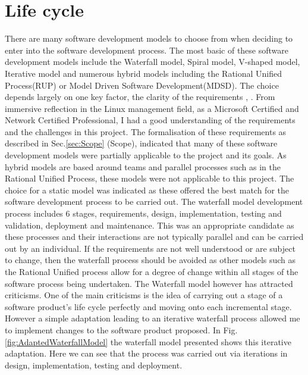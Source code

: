 \section{Life cycle}

	\normalsize
	{
		There are many software development models to choose from when deciding to enter into the software development process.
		The most basic of these software development models include the Waterfall model, Spiral model, V-shaped model, Iterative model
		and numerous hybrid models including the Rational Unified Process(RUP) or Model Driven Software Development(MDSD).			
		\newline
		\newline
		The choice depends largely on one key factor, the clarity of the requirements 
		\citet{CompleteDevelopmentCycle}, \citet{RequirementsVolatility}.
		From immersive reflection in the Linux management field, as a Microsoft Certified and Network Certified Professional,
		I had a good understanding of the requirements and the challenges in this project.  
		\newline
		\newline
		The formalisation of these requirements as described in Sec.\ref{sec:Scope} (Scope), indicated that many of these software development models 
		were partially applicable to the project and its goals.  As hybrid models are based around teams and parallel processes such as
		in the Rational Unified Process, these models were not applicable to this project.
		\newline
		\newline
		The choice for a static model was indicated as these offered the best match for the software development process to be carried out.	
		The waterfall model development process includes 6 stages, requirements, 
		design, implementation, testing and validation, deployment and maintenance.
		This was an appropriate candidate as these processes and their interactions are not typically 
		parallel and can be carried out by an individual.  
		\newline
		\newline
		If the requirements are not well understood or are subject to change, then the waterfall process should be avoided
		as other models such as the Rational Unified process allow for a degree of change within all stages of the software
		process being undertaken.
		\newline
		\newline
		The Waterfall model however has attracted criticisms.  One of the main criticisms is the idea of carrying out a stage of a software product's 
		life cycle perfectly and moving onto each incremental stage.  However a simple adaptation leading to an iterative waterfall process allowed me to 
		implement changes to the software product proposed. 	In Fig. \ref{fig:AdaptedWaterfallModel} the waterfall model presented shows this iterative adaptation.  
		Here we can see that the process was carried out via iterations in design, implementation, testing and deployment.
		
}
